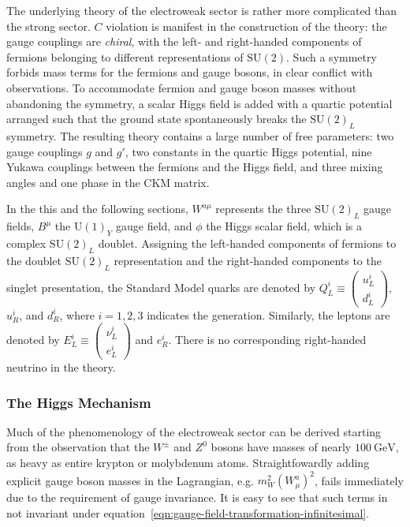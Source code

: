 The underlying theory of the electroweak sector is rather more complicated than the strong sector. $C$ violation is manifest in the construction of the theory: the gauge couplings are \emph{chiral}, with the left- and right-handed components of fermions belonging to different representations of $\mathrm{SU}(2)$. Such a symmetry forbids mass terms for the fermions and gauge bosons, in clear conflict with observations. To accommodate fermion and gauge boson masses without abandoning the symmetry, a scalar Higgs field is added with a quartic potential arranged such that the ground state spontaneously breaks the $\mathrm{SU}(2)_L$ symmetry. The resulting theory contains a large number of free parameters: two gauge couplings $g$ and $g'$, two constants in the quartic Higgs potential, nine Yukawa couplings between the fermions and the Higgs field, and three mixing angles and one phase in the CKM matrix. 


In the this and the following sections, $W^{a\mu}$ represents the three $\mathrm{SU}(2)_L$ gauge fields, $B^{\mu}$ the $\mathrm{U}(1)_Y$ gauge field, and $\phi$ the Higgs scalar field, which is a complex $\mathrm{SU}(2)_L$ doublet. Assigning the left-handed components of fermions to the doublet $\mathrm{SU}(2)_L$ representation and the right-handed components to the singlet presentation, the Standard Model quarks are denoted by $Q_L^i\equiv \left(\begin{array}{c} u^i_L \\ d^i_L \end{array}\right)$, $u_R^i$, and $d_R^i$, where $i=1,2,3$ indicates the generation. Similarly, the leptons are denoted by $E_L^i\equiv \left(\begin{array}{c} \nu_L^i \\ e_L^i \end{array}\right)$ and $e_R^i$. There is no corresponding right-handed neutrino in the theory. 

\subsubsection{The Higgs Mechanism}
Much of the phenomenology of the electroweak sector can be derived starting from the observation that the $W^{\pm}$ and $Z^0$ bosons have masses of nearly $\SI{100}{\giga\electronvolt}$, as heavy as entire krypton or molybdenum atoms. Straightfowardly adding explicit gauge boson masses in the Lagrangian, e.g. $m_W^2 (W_{\mu}^a)^2$, fails immediately  due to the requirement of gauge invariance. It is easy to see that such terms in not invariant under equation~\ref{eqn:gauge-field-transformation-infinitesimal}.

